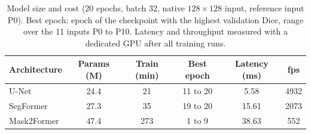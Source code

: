 \begin{table}[t]
\centering
\caption{Model size and cost (20 epochs, batch 32, native $128\times128$ input, reference input P0). Best epoch: epoch of the checkpoint with the highest validation Dice, range over the 11 inputs P0 to P10. Latency and throughput measured with a dedicated GPU after all training runs.}
\label{tab:cost}
\scriptsize
\setlength{\tabcolsep}{3pt}
\begin{tabularx}{\columnwidth}{Y c c c c c}
\toprule
\textbf{Architecture} & \textbf{Params (M)} & \textbf{Train (min)} & \textbf{Best epoch} & \textbf{Latency (ms)} & \textbf{fps} \\
\midrule
U-Net & 24.4 & 21 & 11 to 20 & 5.58 & 4932 \\
SegFormer & 27.3 & 35 & 19 to 20 & 15.61 & 2073 \\
Mask2Former & 47.4 & 273 & 1 to 9 & 38.63 & 552 \\
\bottomrule
\end{tabularx}
\end{table}
